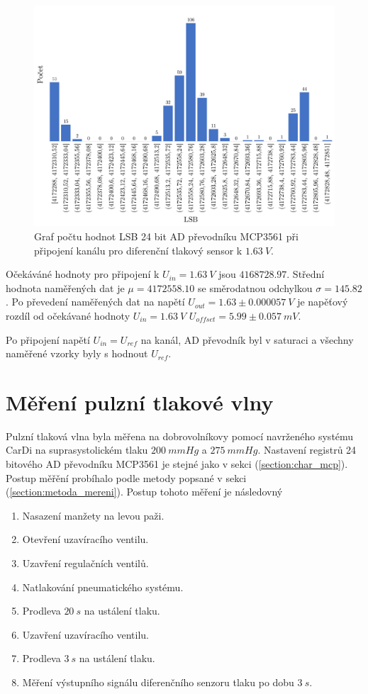 \begin{figure}[H]
    \caption{Graf počtu hodnot LSB 24 bit AD převodníku MCP3561 při připojení kanálu
        pro diferenční tlakový sensor k  $1.63 \ V$.}
    \includegraphics[width=1\textwidth]{graphs/mcp_16.png}
\end{figure}
Očekáváné hodnoty pro připojení k $U_{in} = 1.63 \ V$ jsou $4168728.97$. Střední hodnota naměřených dat je $\mu = 4172558.10$ se směrodatnou odchylkou $\sigma = 145.82$. Po převedení naměřených dat na napětí $U_{out} = 1.63 \pm 0.000057\ V$ je napěťový rozdíl od očekávané hodnoty $U_{in} = 1.63 \ V$
$U_{offset} = 5.99 \pm 0.057 \ mV$.
\par
Po připojení napětí $U_{in} = U_{ref}$ na kanál, AD převodník byl v saturaci a všechny naměřené vzorky byly s hodnout $U_{ref}$.

\pagebreak
\section{Měření pulzní tlakové vlny}
Pulzní tlaková vlna byla měřena na dobrovolníkovy pomocí navrženého systému CarDi na suprasystolickém tlaku $200 \ mmHg$ a $275 \ mmHg$. Nastavení registrů 24 bitového AD převodníku MCP3561 je stejné jako v sekci (\ref{section:char_mcp}).
Postup měřění probíhalo podle metody popsané v sekci (\ref{section:metoda_mereni}). Postup tohoto měření je následovný
\begin{enumerate}
    \item Nasazení manžety na levou paži.
    \item Otevření uzavíracího ventilu.
    \item Uzavření regulačních ventilů.
    \item Natlakování pneumatického systému.
    \item Prodleva $20 \ s$ na ustálení tlaku.
    \item Uzavření uzavíracího ventilu.
    \item Prodleva $3 \ s$ na ustálení tlaku.
    \item Měření výstupního signálu diferenčního senzoru tlaku po dobu $3 \ s $.
\end{enumerate}

